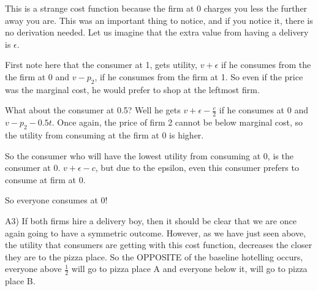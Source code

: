 \documentclass[12pt]{report}
\numberwithin{equation}{section}
\begin{document}

This is a strange cost function because the firm at 0 charges you less the further away you are. This was an important thing to notice, and if you notice it, there is no derivation needed. Let us imagine that the extra value from having a delivery is $\epsilon$. 

First note here that the consumer at 1, gets utility, $v+\epsilon$ if he consumes from the the firm at 0 and $v-p_2$, if he consumes from the firm at 1. So even if the price was the marginal cost, he would prefer to shop at the leftmost firm.  

What about the consumer at 0.5? Well he gets $v+\epsilon-\frac{c}{2}$ if he consumes at 0 and $v-p_2-0.5t$. Once again, the price of firm 2 cannot be below marginal cost, so the utility from consuming at the firm at $0$ is higher. 

So the consumer who will have the lowest utility from consuming at 0, is the consumer at 0. $v+\epsilon-c$, but due to the epsilon, even this consumer prefers to consume at firm at 0. 

So everyone consumes at 0! 

A3) If both firms hire a delivery boy, then it should be clear that we are once again going to have a symmetric outcome. However, as we have just seen above, the utility that consumers are getting with this cost function, decreases the closer they are to the pizza place. So the OPPOSITE of the baseline hotelling occurs, everyone above $\frac{1}{2}$ will go to pizza place A and everyone below it, will go to pizza place B. 
\end{document}
